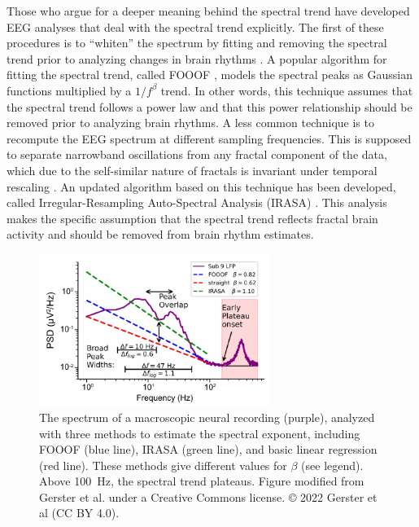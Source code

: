 Those who argue for a deeper meaning behind the spectral trend have developed EEG analyses that deal with the spectral trend explicitly. The first of these procedures is to ``whiten'' the spectrum by fitting and removing the spectral trend prior to analyzing changes in brain rhythms \cite{Buzsaki2004,Buzsaki2006,Donoghue2020}. A popular algorithm for fitting the spectral trend, called FOOOF \cite{Donoghue2020}, models the spectral peaks as Gaussian functions multiplied by a $1/f^\beta$ trend. In other words, this technique assumes that the spectral trend follows a power law and that this power relationship should be removed prior to analyzing brain rhythms. A less common technique is to recompute the EEG spectrum at different sampling frequencies. This is supposed to separate narrowband oscillations from any fractal component of the data, which due to the self-similar nature of fractals is invariant under temporal rescaling \cite{Yamamoto1993}. An updated algorithm based on this technique has been developed, called Irregular-Resampling Auto-Spectral Analysis (IRASA) \cite{Wen2016}. This analysis makes the specific assumption that the spectral trend reflects fractal brain activity and should be removed from brain rhythm estimates.

\begin{figure}
\vspace{-15pt}
\includegraphics[width=75mm]{Figures/chapter1/gerster.pdf}
\vspace{-10pt}
\caption{  The spectrum of a macroscopic neural recording (purple), analyzed with three methods to estimate the spectral exponent, including FOOOF (blue line), IRASA (green line), and basic linear regression (red line). These methods give different values for $\beta$ (see legend). Above \qty{100}{\hertz}, the spectral trend plateaus. Figure modified from Gerster et al. \cite{Gerster2022} under a Creative Commons license. © 2022 Gerster et al (CC BY 4.0).
} \label{fig:gerster}
\end{figure}

